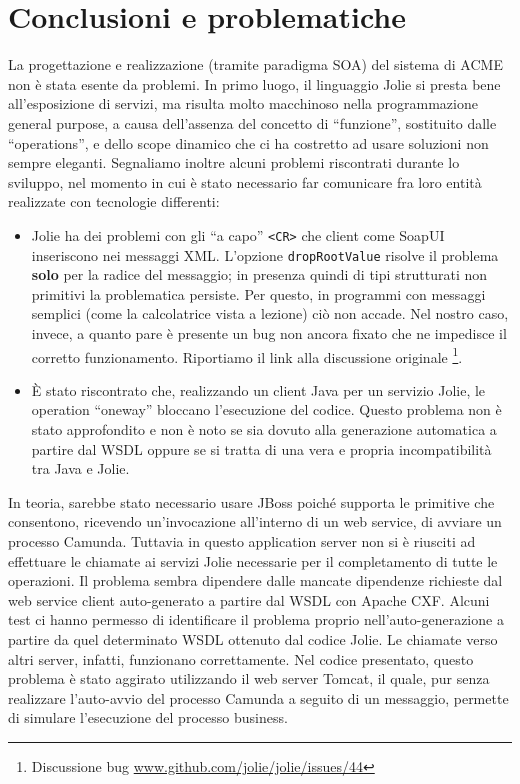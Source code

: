 \documentclass[twoside]{article}
\begin{document}
\section{Conclusioni e problematiche} \label{conclusioni}
La progettazione e realizzazione (tramite paradigma SOA) del sistema di ACME
non è stata esente da problemi. In primo luogo, il linguaggio
Jolie si presta bene all'esposizione di servizi, ma risulta molto macchinoso
nella programmazione general purpose, a causa dell'assenza del concetto di ``funzione'',
sostituito dalle ``operations'', e dello scope dinamico che ci ha costretto
ad usare soluzioni non sempre eleganti. Segnaliamo inoltre alcuni problemi
riscontrati durante lo sviluppo, nel momento in cui è stato necessario
far comunicare fra loro entità realizzate con tecnologie differenti:
\begin{itemize}
	\item  Jolie ha dei problemi con gli ``a capo'' \texttt{<CR>} 
		   che client come SoapUI inseriscono nei messaggi XML.
		   L'opzione \texttt{dropRootValue} risolve il problema \textbf{solo} per la radice del messaggio;
		   in presenza quindi di tipi strutturati non primitivi la problematica persiste.
		   Per questo, in programmi con messaggi semplici (come la calcolatrice vista a lezione)
		   ciò non accade. Nel nostro caso, invece, a quanto pare 
		   è presente un bug non ancora fixato che ne impedisce il corretto funzionamento.
		   Riportiamo il link alla discussione originale
		   \footnote{Discussione bug \url{www.github.com/jolie/jolie/issues/44}}.
	\item \`E stato riscontrato che, realizzando un client Java per un servizio Jolie,
		  le operation ``oneway'' bloccano l'esecuzione del codice. Questo problema non
		  è stato approfondito e non è noto se sia dovuto alla generazione automatica
		  a partire dal WSDL oppure se si tratta di una vera e propria incompatibilità tra Java e Jolie.
\end{itemize}

In teoria, sarebbe stato necessario usare JBoss poiché supporta le primitive che consentono,
ricevendo un'invocazione all'interno di un web service, di avviare un processo Camunda. Tuttavia
in questo application server non si è riusciti ad effettuare le chiamate ai servizi Jolie
necessarie per il completamento di tutte le operazioni. Il problema sembra dipendere
dalle mancate dipendenze richieste dal web service client auto-generato a partire dal WSDL
con Apache CXF. Alcuni test ci hanno permesso di identificare il problema
proprio nell'auto-generazione a partire da quel determinato WSDL ottenuto dal codice Jolie.
Le chiamate verso altri server, infatti, funzionano correttamente.
Nel codice presentato, questo problema è stato aggirato utilizzando il web server Tomcat, il quale,
pur senza realizzare l'auto-avvio del processo Camunda a seguito di un messaggio,
permette di simulare l'esecuzione del processo business.
\end{document}
